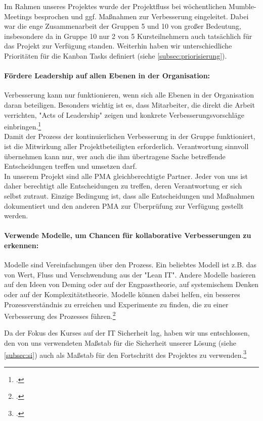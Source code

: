 Im Rahmen unseres Projektes wurde der Projektfluss bei wöchentlichen
Mumble-Meetings besprochen und ggf. Maßnahmen zur Verbesserung eingeleitet.
Dabei war die enge Zusammenarbeit der Gruppen 5 und 10 von großer Bedeutung,
insbesondere da in Gruppe 10 nur 2 von 5 Kursteilnehmern auch tatsächlich für
das Projekt zur Verfügung standen. Weiterhin haben wir unterschiedliche
Prioritäten für die Kanban Tasks definiert (siehe
\ref{subsec:priorisierung}).\\

\paragraph{Fördere Leadership auf allen Ebenen in der Organisation:}
Verbesserung kann nur funktionieren, wenn sich alle Ebenen in der Organisation
daran beteiligen. Besonders wichtig ist es, dass Mitarbeiter, die direkt die
Arbeit verrichten, "Acts of Leadership" zeigen und konkrete
Verbesserungsvorschläge einbringen.\footcite{wikiKanban}\\

Damit der Prozess der kontinuierlichen Verbesserung in der Gruppe funktioniert,
ist die Mitwirkung aller Projektbeteiligten erforderlich. Verantwortung
sinnvoll übernehmen kann nur, wer auch die ihm übertragene Sache betreffende
Entscheidungen treffen und umsetzen darf.\\

In unserem Projekt sind alle PMA gleichberechtigte Partner. Jeder von uns ist
daher berechtigt alle Entscheidungen zu treffen, deren Verantwortung er sich
selbst zutraut. Einzige Bedingung ist, dass alle Entscheidungen und Maßnahmen
dokumentiert und den anderen PMA zur Überprüfung zur Verfügung gestellt werden.

\paragraph{Verwende Modelle, um Chancen für kollaborative Verbesserungen zu erkennen:}
Modelle sind Vereinfachungen über den Prozess. Ein beliebtes Modell ist z.B.
das von Wert, Fluss und Verschwendung aus der "Lean IT". Andere Modelle
basieren auf den Ideen von Deming oder auf der Engpasstheorie, auf systemischem
Denken oder auf der Komplexitätstheorie. Modelle können dabei helfen, ein
besseres Prozessverständnis zu erreichen und Experimente zu finden, die zu
einer Verbesserung des Prozesses führen.\footcite{wikiKanban}

Da der Fokus des Kurses auf der IT Sicherheit lag, haben wir uns entschlossen,
den von uns verwendeten Maßstab für die Sicherheit unserer Lösung (siehe
\ref{subsec:si}) auch als Maßstab für den Fortschritt des Projektes zu
verwenden.\footcite{wikiKanban} \\

